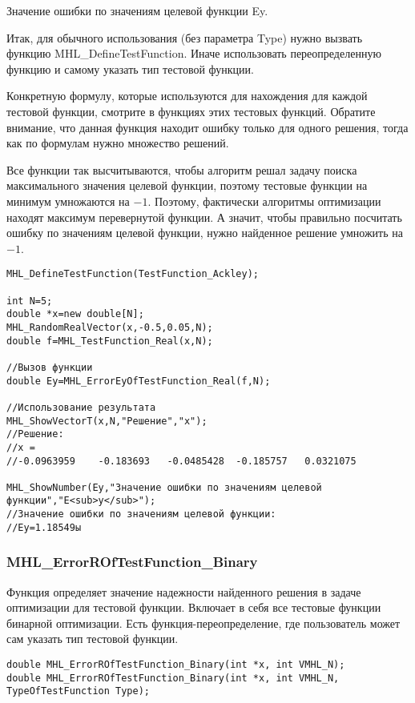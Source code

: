 \documentclass[a4paper,12pt]{article}
\begin{document}
Значение ошибки по значениям целевой функции Ey.

Итак, для обычного использования (без параметра Type) нужно вызвать функцию MHL\_DefineTestFunction. Иначе использовать переопределенную функцию и самому указать тип тестовой функции.

Конкретную формулу, которые используются для нахождения для каждой тестовой функции, смотрите в функциях этих тестовых функций. Обратите внимание, что данная функция находит ошибку только для одного решения, тогда как по формулам нужно множество решений.

Все функции так высчитываются, чтобы алгоритм решал задачу поиска максимального значения целевой функции, поэтому тестовые функции на минимум умножаются на $-1$. Поэтому, фактически алгоритмы оптимизации находят максимум перевернутой функции. А значит, чтобы правильно посчитать ошибку по значениям целевой функции, нужно найденное решение умножить на $-1$.


\begin{lstlisting}[label=code_use_MHL_ErrorEyOfTestFunction_Real,caption=Пример использования]
MHL_DefineTestFunction(TestFunction_Ackley);

int N=5;
double *x=new double[N];
MHL_RandomRealVector(x,-0.5,0.05,N);
double f=MHL_TestFunction_Real(x,N);

//Вызов функции
double Ey=MHL_ErrorEyOfTestFunction_Real(f,N);

//Использование результата
MHL_ShowVectorT(x,N,"Решение","x");
//Решение:
//x =
//-0.0963959	-0.183693	-0.0485428	-0.185757	0.0321075

MHL_ShowNumber(Ey,"Значение ошибки по значениям целевой функции","E<sub>y</sub>");
//Значение ошибки по значениям целевой функции:
//Ey=1.18549ы
\end{lstlisting}

\subsubsection{MHL\_ErrorROfTestFunction\_Binary}\label{MHL_ErrorROfTestFunction_Binary}

Функция определяет значение надежности найденного решения в задаче оптимизации для тестовой функции. Включает в себя все тестовые функции бинарной оптимизации. Есть функция-переопределение, где пользователь может сам указать тип тестовой функции.


\begin{lstlisting}[label=code_syntax_MHL_ErrorROfTestFunction_Binary,caption=Синтаксис]
double MHL_ErrorROfTestFunction_Binary(int *x, int VMHL_N);
double MHL_ErrorROfTestFunction_Binary(int *x, int VMHL_N, TypeOfTestFunction Type);
\end{lstlisting}
\end{document}
